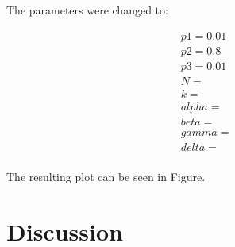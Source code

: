 \documentclass[a4paper,12pt]{article}
\begin{document}
The parameters were changed to:
\begin{center}
\begin{displaymath}
\begin{split}
p1= 0.01\\ %
p2= 0.8\\ %
p3= 0.01\\ %
N=\\
k=\\
alpha=\\
beta=\\
gamma=\\
delta=\\
\end{split}
\end{displaymath}
\end{center}


The resulting plot can be seen in Figure.



\section{Discussion}
\end{document}
